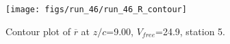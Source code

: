 \begin{figure}[H]
\centering
\texttt{[image: figs/run\_46/run\_46\_R\_contour]}
\caption{Contour plot of $\overline{r}$ at $z/c$=9.00, $V_{free}$=24.9, station 5.}
\end{figure}


